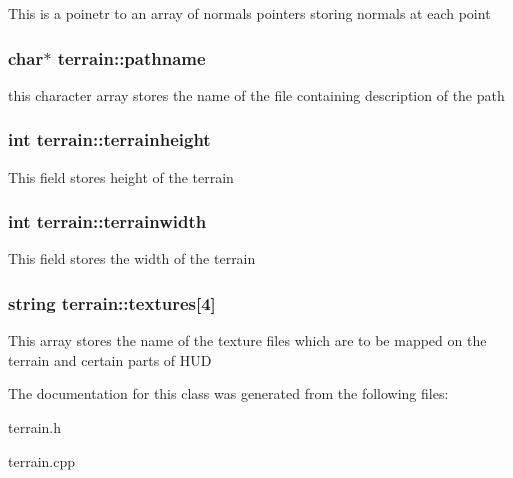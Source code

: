 \-This is a poinetr to an array of normals pointers storing normals at each point \hypertarget{classterrain_a71b1c37938c0112a98a605855f7d9eef}{
\subsubsection[{pathname}]{\setlength{\rightskip}{0pt plus 5cm}char$\ast$ {\bf terrain\-::pathname}}}\label{classterrain_a71b1c37938c0112a98a605855f7d9eef}
this character array stores the name of the file containing description of the path \hypertarget{classterrain_a1243f9d89e96dd55c48ea97eeea4053d}{
\subsubsection[{terrainheight}]{\setlength{\rightskip}{0pt plus 5cm}int {\bf terrain\-::terrainheight}}}\label{classterrain_a1243f9d89e96dd55c48ea97eeea4053d}
\-This field stores height of the terrain \hypertarget{classterrain_a50b9180d571e351f6c990c20eb49e18d}{
\subsubsection[{terrainwidth}]{\setlength{\rightskip}{0pt plus 5cm}int {\bf terrain\-::terrainwidth}}}\label{classterrain_a50b9180d571e351f6c990c20eb49e18d}
\-This field stores the width of the terrain \hypertarget{classterrain_ad6747f910061feba36ea983cc791c82f}{
\subsubsection[{textures}]{\setlength{\rightskip}{0pt plus 5cm}string {\bf terrain\-::textures}\mbox{[}4\mbox{]}}}\label{classterrain_ad6747f910061feba36ea983cc791c82f}
\-This array stores the name of the texture files which are to be mapped on the terrain and certain parts of \-H\-U\-D 

\-The documentation for this class was generated from the following files\-:\begin{DoxyCompactItemize}
\item 
terrain.\-h\item 
terrain.\-cpp\end{DoxyCompactItemize}
